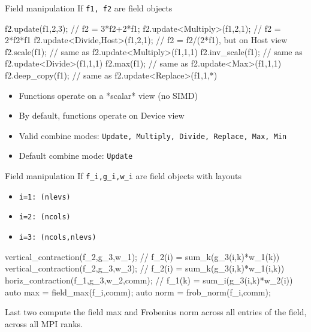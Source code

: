 \documentclass[8pt,NM,theme=angles,number=2023-00000]{sandia-beamer}
\begin{document}
\begin{frame}[fragile]{Field manipulation}
  If \texttt{f1, f2} are field objects

  \vspace{-0.5cm}
  \begin{semiverbatim} \small
    f2.update(f1,2,3);              // f2 = 3*f2+2*f1;
    f2.update<Multiply>(f1,2,1);    // f2 = 2*f2*f1
    f2.update<Divide,Host>(f1,2,1); // f2 = f2/(2*f1), but on Host view
    f2.scale(f1);                   // same as f2.update<Multiply>(f1,1,1)
    f2.inv\_scale(f1);              // same as f2.update<Divide>(f1,1,1)
    f2.max(f1);                     // same as f2.update<Max>(f1,1,1)
    f2.deep\_copy(f1);              // same as f2.update<Replace>(f1,1,*)
  \end{semiverbatim}

  \vspace{-0.5cm}
  \begin{itemize}
    \item Functions operate on a *scalar* view (no SIMD)
    \item By default, functions operate on Device view
    \item Valid combine modes: \texttt{Update, Multiply, Divide, Replace, Max, Min}
    \item Default combine mode: \texttt{Update}
  \end{itemize}
\end{frame}

\begin{frame}[fragile]{Field manipulation}
  If \texttt{f\_i,g\_i,w\_i} are field objects with layouts

  \begin{itemize}
    \item \texttt{i=1: (nlevs)} 
    \item \texttt{i=2: (ncols)} 
    \item \texttt{i=3: (ncols,nlevs)} 
  \end{itemize}

  \vspace{-0.5cm}
  \begin{semiverbatim} \small
    vertical\_contraction(f\_2,g\_3,w\_1); // f\_2(i) = sum\_k(g\_3(i,k)*w\_1(k))
    vertical\_contraction(f\_2,g\_3,w\_3); // f\_2(i) = sum\_k(g\_3(i,k)*w\_1(i,k))
    horiz\_contraction(f\_1,g\_3,w\_2,comm); // f\_1(k) = sum\_i(g\_3(i,k)*w\_2(i))
    auto max = field\_max(f\_i,comm);
    auto norm = frob\_norm(f\_i,comm);
  \end{semiverbatim}
  Last two compute the field max and Frobenius norm across all entries of the field, across all MPI ranks.

\end{frame}
\end{document}
